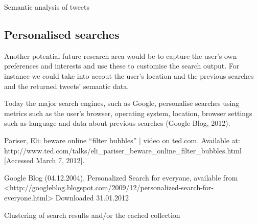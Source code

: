 Semantic analysis of tweets

\subsection{Personalised searches}
Another potential future research area would be to capture the user's own preferences and interests and use these to customise the search output. For instance we could take into accout the user's location and the previous searches and the returned tweets' semantic data.

Today the major search engines, such as Google, personalise searches using metrics such as the user's browser, operating system, location, browser settings such as language and data about previous searches (Google Blog, 2012).

Pariser, Eli: beware online “filter bubbles” | video on ted.com. Available at: http://www.ted.com/talks/eli_pariser_beware_online_filter_bubbles.html [Accessed March 7, 2012].

Google Blog (04.12.2004), Personalized Search for everyone, available from <http://googleblog.blogspot.com/2009/12/personalized-search-for-everyone.html> Downloaded 31.01.2012

Clustering of search results and/or the cached collection